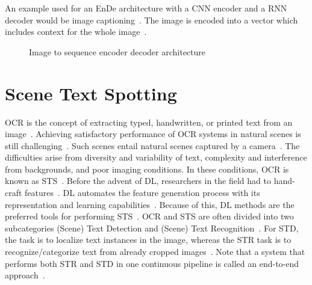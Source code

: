 An example used for an \ac{EnDe} architecture with a \ac{CNN} encoder and a \ac{RNN} decoder
would be image captioning~\citep{asadi_encoder-decoder_2020}.
The image is encoded into a vector which includes context for the whole
image~\citep{asadi_encoder-decoder_2020}.
\begin{figure}[h]
    \centering
    \caption[Image to sequence encoder decoder architecture]{%
        Image to sequence encoder decoder
        architecture~\citep{asadi_encoder-decoder_2020}\label{fig:enc-dec-cnn}
    }
\end{figure}

\section{Scene Text Spotting}\label{se:sts}
\ac{OCR} is the concept of extracting typed, handwritten, or printed text
from an image~\citep{zhao_improving_2020}.
Achieving satisfactory performance of \ac{OCR} systems in natural scenes is still
challenging~\citep{zhao_improving_2020, chen_text_2021}.
Such scenes entail natural scenes captured by a camera~\citep{chen_text_2021, baek_what_2019}.
The difficulties arise from diversity and variability of text, complexity and interference from
backgrounds, and poor imaging conditions.
In these conditions, \ac{OCR} is known as \ac{STS}~\citep{long_scene_2021}.
Before the advent of \ac{DL}, researchers in the field had to hand-craft
features~\citep{long_scene_2021}.
\ac{DL} automates the feature generation process with its representation and learning
capabilities~\citep{long_scene_2021,goodfellow_deep_2016}.
Because of this, \ac{DL} methods are the preferred tools for performing
\ac{STS}~\citep{long_scene_2021}.
\ac{OCR} and \ac{STS} are often divided into two subcategories (Scene) Text Detection and (Scene)
Text Recognition~\citep{zhao_improving_2020, long_scene_2021,chen_text_2021}.
For \ac{STD}, the task is to localize text instances in the image, whereas the \ac{STR} task
is to recognize/categorize text from already cropped images~\citep{chen_text_2021}.
Note that a system that performs both \ac{STR} and \ac{STD} in one continuous pipeline is called
an end-to-end approach~\citep{chen_text_2021}.

